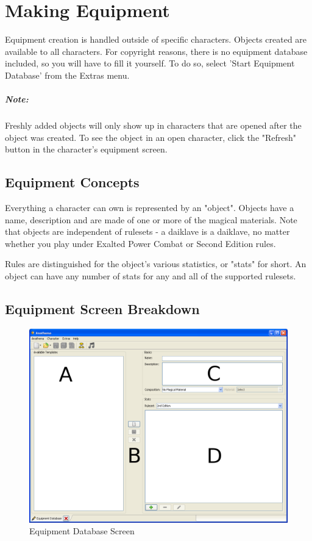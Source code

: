 \chapter{Making Equipment}
Equipment creation is handled outside of specific characters. Objects created are available to all characters. For copyright reasons, there is no equipment database included, so you will have to fill it yourself.  To do so, select 'Start Equipment Database' from the Extras menu.

\paragraph{Note:} Freshly added objects will only show up in characters that are opened after the object was created. To see the object in an open character, click the "Refresh" button in the character's equipment screen.

\section{Equipment Concepts}
Everything a character can own is represented by an "object". Objects have a name, description and are made of one or more of the magical materials. Note that objects are independent of rulesets - a daiklave is a daiklave, no matter whether you play under Exalted Power Combat or Second Edition rules.

Rules are distinguished for the object's various statistics, or "stats" for short. An object can have any number of stats for any and all of the supported rulesets.

\section{Equipment Screen Breakdown}
\begin{figure}
	\centering
		\includegraphics[width=1.00\textwidth]{images/Equipment.png}
	\caption{Equipment Database Screen}
	\label{fig:Equipment}
\end{figure}


